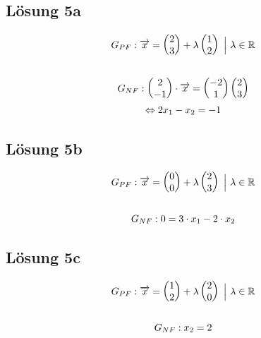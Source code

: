 \subsection{Lösung 5a}
\begin{gather*}
	G_{PF} :\vec{x}=\begin{pmatrix}
		2\\
		3
	\end{pmatrix} +\lambda \begin{pmatrix}
		1\\
		2
	\end{pmatrix} \ \Bigl| \ \lambda \in \mathbb{R}\\
	\\
	G_{NF} : \begin{pmatrix}
		2\\
		-1
	\end{pmatrix} \cdot \vec{x} = \begin{pmatrix}
		-2\\
		1
	\end{pmatrix}\begin{pmatrix}
		2\\
		3
	\end{pmatrix}\\
	\Leftrightarrow 2 x_1 - x_2 = -1
\end{gather*}

\subsection{Lösung 5b}
\begin{gather*}
	G_{PF} :\vec{x}=\begin{pmatrix}
		0\\
		0
	\end{pmatrix} +\lambda \begin{pmatrix}
		2\\
		3
	\end{pmatrix} \ \Bigl| \ \lambda \in \mathbb{R}\\
	\\
	G_{NF} : 0 = 3 \cdot x_1 - 2 \cdot x_2
\end{gather*}

\subsection{Lösung 5c}
\begin{gather*}
	G_{PF} :\vec{x}=\begin{pmatrix}
		1\\
		2
	\end{pmatrix} +\lambda \begin{pmatrix}
		2\\
		0
	\end{pmatrix} \ \Bigl| \ \lambda \in \mathbb{R}\\
	\\
	G_{NF} : x_2 = 2
\end{gather*}